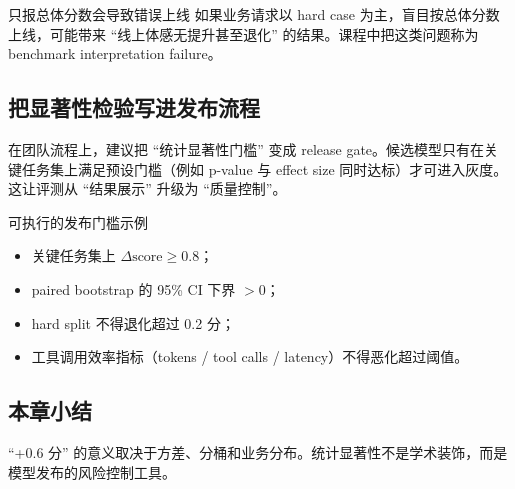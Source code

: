 \begin{warningbox}{只报总体分数会导致错误上线}
如果业务请求以 hard case 为主，盲目按总体分数上线，可能带来 ``线上体感无提升甚至退化'' 的结果。课程中把这类问题称为 benchmark interpretation failure。
\end{warningbox}

\subsection{把显著性检验写进发布流程}
在团队流程上，建议把 ``统计显著性门槛'' 变成 release gate。候选模型只有在关键任务集上满足预设门槛（例如 p-value 与 effect size 同时达标）才可进入灰度。这让评测从 ``结果展示'' 升级为 ``质量控制''。

\begin{importantbox}{可执行的发布门槛示例}
\begin{itemize}
    \item 关键任务集上 $\Delta \text{score} \ge 0.8$；
    \item paired bootstrap 的 95\% CI 下界 $>0$；
    \item hard split 不得退化超过 0.2 分；
    \item 工具调用效率指标（tokens / tool calls / latency）不得恶化超过阈值。
\end{itemize}
\end{importantbox}

\subsection{本章小结}
``+0.6 分'' 的意义取决于方差、分桶和业务分布。统计显著性不是学术装饰，而是模型发布的风险控制工具。

